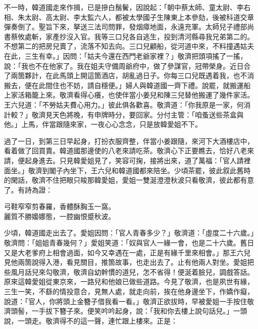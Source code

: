 不一時，韓道國走來作揖，已是摻白鬚鬢，{}因說起：「朝中蔡太師、童太尉、李右相、朱太尉、高太尉、李太監六人，都被太學國子生陳東上本參劾，後被科道交章彈奏倒了。{}聖旨下來，拏送三法司問罪，發烟瘴地面，永遠充軍。太師兒子禮部尚書蔡攸處斬，家產抄沒入官。我等三口兒各自逃生，投到清河縣尋我兄弟第二的。不想第二的把房兒賣了，流落不知去向。三口兒顧船，從河道中來，不料撞遇姑夫在此，三生有幸。」因問：「姑夫今還在西門老爺家裡？」敬濟把頭項搖了一搖，說：「我也不在他家了。{}我在姐夫守備周爺府中，做了參謀官，冠帶榮身。近日合了兩箇夥計，在此馬頭上開這箇酒店，胡亂過日子。你每三口兒既遇着我，也不消搬去，便在此間住也不妨，請自穩便。」婦人與韓道國一齊下禮。說罷，就搬運船上家活箱籠上來。敬濟看得心癢，也使伴當小姜兒和陳三兒替他搬運了幾件家活。{}王六兒道：「不勞姑夫費心用力。」彼此俱各歡喜。敬濟道：「你我原是一家，何消計較？」敬濟見天色將晚，有申牌時分，要回家。分付主管：「咱蚤送些茶盒與他。」上馬，伴當跟隨來家，一夜心心念念，只是放韓愛姐不下。

過了一日，到第三日早起身，打扮衣服齊整，伴當小姜跟隨，來河下大酒樓店中，看着做了回買賣。韓道國那邊使的八老來請吃茶。敬濟心下正要瞧去，恰好八老來請，便起身進去。只見韓愛姐見了，笑容可掬，{}接將出來，道了萬福：「官人請裡面坐。」敬濟到閣子內坐下，王六兒和韓道國都來陪坐。少頃茶罷，彼此叙此舊時的閑話，敬濟不住把眼只睃那韓愛姐，愛姐一雙涎澄澄秋波只看敬濟，{}彼此都有意了。有詩為證：

\begin{myquote}
弓鞋窄窄剪春羅，香體酥胸玉一窩。\\麗質不勝嬝娜態，一腔幽恨蹙秋波。
\end{myquote}

少頃，韓道國走出去了。愛姐因問：「官人青春多少？」敬濟道：「虛度二十六歲。」敬濟問：「姐姐青春幾何？」愛姐笑道：「奴與官人一緣一會，也是二十六歲。舊日又是大老爹府上相會過面，如今又幸遇在一處，正是有緣千里來相會。」{}那王六兒見他兩箇說得入港，看見關目，推箇故事，也走出去了。{}止有他兩人對坐。愛姐把些風月話兒來勾敬濟，敬濟自幼幹慣的道兒，怎不省得！便涎着臉兒，調戲答話。原來這韓愛姐從東京來，一路兒和他娘已做些道路。{}今見了敬濟，也是夙世有緣，三生一笑，不繇的情投意合，見無人處，就走向前，挨在他身邊坐下，作嬌作癡，說道：「官人，你將頭上金簪子借我看一看。」敬濟正欲拔時，早被愛姐一手按住敬濟頭髻，一手拔下簪子來。{}便笑吟吟起身，說：「我和你去樓上說句話兒。」一頭說，一頭走。敬濟得不的這一聲，連忙跟上樓來。正是：

